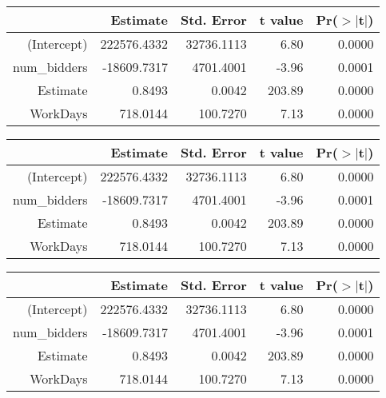 \begin{table}[ht]
\begin{tabular}{rrrrr}
  \toprule
 & Estimate & Std. Error & t value & Pr($>$$|$t$|$) \\ 
  \midrule
(Intercept) & 222576.4332 & 32736.1113 & 6.80 & 0.0000 \\ 
  num\_bidders & -18609.7317 & 4701.4001 & -3.96 & 0.0001 \\ 
  Estimate & 0.8493 & 0.0042 & 203.89 & 0.0000 \\ 
  WorkDays & 718.0144 & 100.7270 & 7.13 & 0.0000 \\ 
   \bottomrule
\end{tabular}
\end{table}
\begin{table}[ht]
\begin{tabular}{rrrrr}
  \toprule
 & Estimate & Std. Error & t value & Pr($>$$|$t$|$) \\ 
  \midrule
(Intercept) & 222576.4332 & 32736.1113 & 6.80 & 0.0000 \\ 
  num\_bidders & -18609.7317 & 4701.4001 & -3.96 & 0.0001 \\ 
  Estimate & 0.8493 & 0.0042 & 203.89 & 0.0000 \\ 
  WorkDays & 718.0144 & 100.7270 & 7.13 & 0.0000 \\ 
   \bottomrule
\end{tabular}
\end{table}
\begin{table}[ht]
\begin{tabular}{rrrrr}
  \toprule
 & Estimate & Std. Error & t value & Pr($>$$|$t$|$) \\ 
  \midrule
(Intercept) & 222576.4332 & 32736.1113 & 6.80 & 0.0000 \\ 
  num\_bidders & -18609.7317 & 4701.4001 & -3.96 & 0.0001 \\ 
  Estimate & 0.8493 & 0.0042 & 203.89 & 0.0000 \\ 
  WorkDays & 718.0144 & 100.7270 & 7.13 & 0.0000 \\ 
   \bottomrule
\end{tabular}
\end{table}
